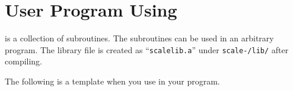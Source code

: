 \section{User Program Using {\scalelib}}

\scalelib is a collection of subroutines.
The subroutines can be used in an arbitrary program.
The library file is created as ``\verb|scalelib.a|'' under \texttt{scale-{\version}/lib/} after compiling.

The following is a template when you use \scalelib in your program.

